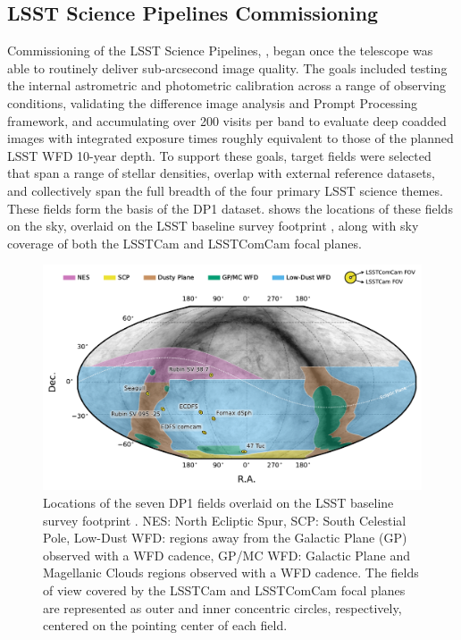 \subsection{LSST Science Pipelines Commissioning}
\label{ssec:pipelines_commissioning}
Commissioning of the LSST Science Pipelines, \citep{PSTN-019},  began once the telescope was able to routinely deliver sub-arcsecond image quality.
The goals included testing the internal astrometric and photometric calibration across a range of observing conditions,
validating the difference image analysis and Prompt Processing \citep{DMTN-219} framework, and accumulating over 200 visits per band to evaluate
deep coadded images with integrated exposure times roughly equivalent to those of the planned LSST \gls{WFD} 10-year depth.
To support these goals, \nfields target fields were selected that span a range of stellar densities, overlap with external reference datasets, and collectively span the full breadth of the four primary \gls{LSST} science themes.
These \nfields fields form the basis of the \gls{DP1} dataset.
 shows the locations of these \nfields fields on the sky, overlaid on the LSST baseline survey footprint \citep{PSTN-051, PSTN-052, PSTN-053, PSTN-055, PSTN-056}, along with sky coverage of both the LSSTCam and \gls{LSSTComCam} focal planes.
\begin{figure}[bt!]
\centering
\includegraphics[width=\linewidth]{dp1_fields_with_survey_fp}
\caption{Locations of the seven DP1 fields overlaid on the LSST baseline survey footprint \citep{PSTN-056}.
NES: North Ecliptic Spur, SCP: South Celestial Pole, Low-Dust WFD: regions away from the Galactic Plane (GP) observed with a WFD cadence, GP/MC WFD: Galactic Plane and Magellanic Clouds regions observed with a WFD cadence.
The fields of view covered by the LSSTCam and LSSTComCam focal planes are represented as outer and inner concentric circles, respectively, centered on the pointing center of each field.}
\label{fig:dp1_fields_on_sky}
\end{figure}

